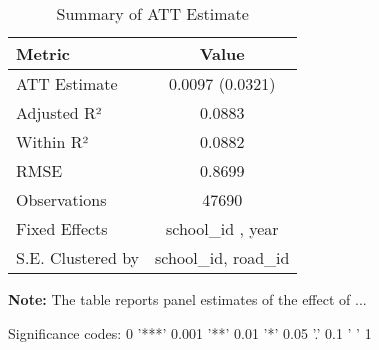 \begin{table}[H]
\centering
\caption{Summary of ATT Estimate}
\label{tab:SA_inse_10p}
 \begin{center}
 \begin{tabular}{lc}
 \toprule
Metric & Value \\
\midrule
ATT Estimate & 0.0097 (0.0321) \\
\hline 
 Adjusted R² & 0.0883 \\
Within R² & 0.0882 \\
RMSE & 0.8699 \\
Observations & 47690 \\
\hline 
 Fixed Effects & school_id ,  year \\
S.E. Clustered by & school_id, road_id \\
\bottomrule
\end{tabular}
 \end{center}\begin{tablenotes}
\small
\item \textbf{Note:} The table reports panel estimates of the effect of ...
\item Significance codes: 0 '***' 0.001 '**' 0.01 '*' 0.05 '.' 0.1 ' ' 1
\end{tablenotes}
\end{table}
